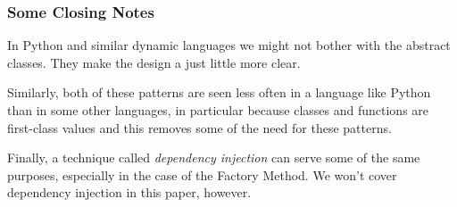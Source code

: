 \documentclass[10pt]{beamer}
\begin{document}
\begin{frame}[fragile]
  \frametitle{Some Closing Notes}
  
  In Python and similar dynamic languages we might not bother with the abstract classes. They
  make the design a just little more clear.
  
  \vspace{5mm}
  Similarly, both of these patterns are seen less often in a language like Python than in some other 
  languages, in particular because classes and functions are first-class values and this removes some 
  of the need for these patterns.
  
  \vspace{5mm}
  Finally, a technique called \emph{dependency injection} can serve some of the same purposes, especially in the case of the 
  Factory Method. We won't cover dependency injection in this paper, however.

  
  \end{frame}
  
\end{document}
